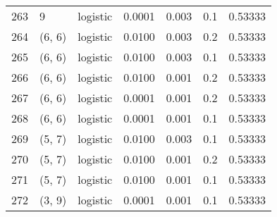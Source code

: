 \begin{tabular}{lllrrrr}
263 &           9 &  logistic &  0.0001 &  0.003 &  0.1 &   0.53333 \\
264 &      (6, 6) &  logistic &  0.0100 &  0.003 &  0.2 &   0.53333 \\
265 &      (6, 6) &  logistic &  0.0100 &  0.003 &  0.1 &   0.53333 \\
266 &      (6, 6) &  logistic &  0.0100 &  0.001 &  0.2 &   0.53333 \\
267 &      (6, 6) &  logistic &  0.0001 &  0.001 &  0.2 &   0.53333 \\
268 &      (6, 6) &  logistic &  0.0001 &  0.001 &  0.1 &   0.53333 \\
269 &      (5, 7) &  logistic &  0.0100 &  0.003 &  0.1 &   0.53333 \\
270 &      (5, 7) &  logistic &  0.0100 &  0.001 &  0.2 &   0.53333 \\
271 &      (5, 7) &  logistic &  0.0100 &  0.001 &  0.1 &   0.53333 \\
272 &      (3, 9) &  logistic &  0.0001 &  0.001 &  0.1 &   0.53333 \\
\bottomrule
\end{tabular}
